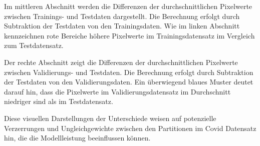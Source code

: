 Im mittleren Abschnitt werden die Differenzen der durchschnittlichen Pixelwerte zwischen Trainings- und Testdaten dargestellt. Die Berechnung erfolgt durch Subtraktion der Testdaten von den Trainingsdaten. Wie im linken Abschnitt kennzeichnen rote Bereiche höhere Pixelwerte im Trainingsdatensatz im Vergleich zum Testdatensatz.

Der rechte Abschnitt zeigt die Differenzen der durchschnittlichen Pixelwerte zwischen Validierungs- und Testdaten. Die Berechnung erfolgt durch Subtraktion der Testdaten von den Validierungsdaten. Ein überwiegend blaues Muster deutet darauf hin, dass die Pixelwerte im Validierungsdatensatz im Durchschnitt niedriger sind als im Testdatensatz.

Diese visuellen Darstellungen der Unterschiede weisen auf potenzielle Verzerrungen und Ungleichgewichte zwischen den Partitionen im Covid Datensatz hin, die die Modellleistung beeinflussen können.

\newpage